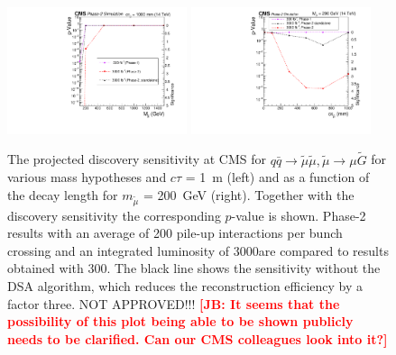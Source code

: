 \begin{figure}[t]\begin{center}
\includegraphics[width=0.47\textwidth]{figures/SignificanceComp.pdf}
\includegraphics[width=0.47\textwidth]{figures/SignificanceComp_asfuncofCtau.pdf}
\caption{The projected discovery sensitivity at CMS for  $q \bar q \to \widetilde{\mu} \widetilde{\mu}, \widetilde{\mu}\rightarrow \mu\widetilde{G}$ for various mass hypotheses and $c\tau$ = 1~m (left) and as a function of the decay length for $m_{\widetilde{\mu}}$ = 200~GeV (right). Together with the discovery sensitivity the corresponding $p$-value is shown. Phase-2 results with an average of 200 pile-up interactions per bunch crossing and an integrated luminosity of 3000\fbinv are compared to results obtained with 300\fbinv. The black line shows the sensitivity without the DSA algorithm, which reduces the reconstruction efficiency by a factor three. NOT APPROVED!!! {\bf \textcolor{red}{[JB: It seems that the possibility of this plot being able to be shown publicly needs to be clarified.  Can our CMS colleagues look into it?]}}
 }
\label{fig:displResultsSensitiviy}
\end{center}
\end{figure}

